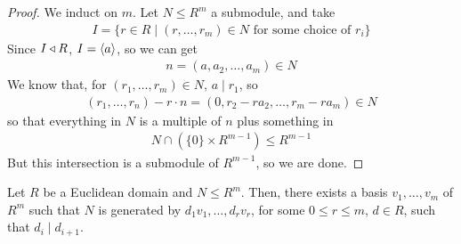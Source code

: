 \documentclass{../../template/note}
\begin{document}
    \begin{proof}
        We induct on $m$. Let $N \leq R^m$ a submodule, and take
        \begin{align*}
            I = \{r \in R \mid (r, \dots, r_m) \in N \text{ for some choice of } r_i\}
        \end{align*}
        Since $I \triangleleft R$, $I = \left \langle a \right \rangle$, so we can get
        \begin{align*}
            n = (a, a_2, \dots, a_m) \in N
        \end{align*}
        We know that, for $(r_1, \dots, r_m) \in N$, $a \mid r_1$, so
        \begin{align*}
            (r_1, \dots, r_n) - r \cdot n = (0, r_2 - ra_2, \dots, r_m - ra_m) \in N
        \end{align*}
        so that everything in $N$ is a multiple of $n$ plus something in
        \begin{align*}
            N \cap \left(\{0\} \times R^{m-1}\right) \leq R^{m-1}
        \end{align*}
        But this intersection is a submodule of $R^{m-1}$, so we are done.     
    \end{proof}
    
    \begin{theorem}
        Let $R$ be a Euclidean domain and $N \leq R^m$. Then, there exists a basis $v_1, \dots, v_m$ of $R^m$ such that $N$ is generated by $d_1v_1, \dots, d_rv_r$, for some $0 \leq r \leq m$, $d \in R$, such that $d_i \mid d_{i+1}$.
    \end{theorem}
    
\end{document}
